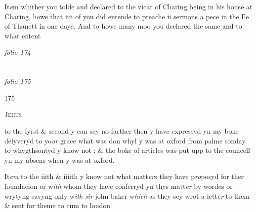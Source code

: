 \documentclass[12pt, a4paper]{book}
\begin{document}
            	
		\ifthenelse{\isodd{\thepage}}
		{\reversemarginpar}
		{\normalmarginpar}
		It\textit{e}m whither you tolde and declared to the vicar of Charing being in his house at Charing, howe that iiii of you did entende to preache ii sermons a pece in the Ile of Thanett in one daye,  And to howe many moo you declared the same and to what entent

\dotfill
					

\textit{folio 174}


         \vspace{4cm}
         
\dotfill
					  \section*{}  \subsection*{}

\textit{folio 175}



\begin{flushright}{\color{Mahogany}175}\end{flushright}
            		
				\begin{center} \begin{large} {\scshape Jehus} \end{large} \end{center}
			
            		
		\ifthenelse{\isodd{\thepage}}
		{\reversemarginpar}
		{\normalmarginpar}
		to the fyrst \& second y can sey no farther then y have expressyd yn my boke delyveryd to yo\textit{ur} grace what was don whyl y was at oxford from palme sonday to whygthsontyd y know not
			 : \& the boke of articles
			 was put upp to the  councell yn my absens when y was at oxford.
            		
		\ifthenelse{\isodd{\thepage}}
		{\reversemarginpar}
		{\normalmarginpar}
		It\textit{em} to the iiith \& iiiith y know not what matt\textit{er}s they have p\textit{ro}posyd for ther foundacion or w\textit{ith} whom they have conferryd yn thys matt\textit{er} by wordes or  wrytyng savyng only w\textit{ith} \textit{sir} john baker w\textit{hich} as they sey wrot a lett\textit{er} to them \& sent for theme to cum to london
            		
\end{document}
